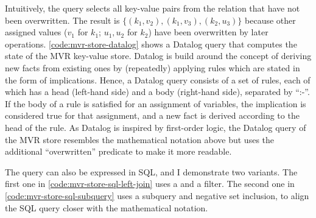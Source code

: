 Intuitively, the query selects all key-value pairs from the  relation
that have not been overwritten.
The result is \(\{ (k_1, v_2), (k_1, v_3), (k_2, u_3)\}\) because other assigned values
(\(v_1\) for \(k_1\); \(u_1, u_2\) for \(k_2\)) have been overwritten by later operations.
\ref{code:mvr-store-datalog} shows a Datalog query that computes the state of the
\ac{MVR} key-value store.
Datalog is build around the concept of deriving new facts from existing ones
by (repeatedly) applying rules which are stated in the form of implications.
Hence, a Datalog query consists of a set of rules, each of which has a
head (left-hand side) and a body (right-hand side), separated by ``:-''.
If the body of a rule is satisfied for an assignment of variables,
the implication is considered true for that assignment,
and a new fact is derived according to the head of the rule.
As Datalog is inspired by first-order logic, the Datalog query of the \ac{MVR}
store resembles the mathematical notation above but uses the
additional ``overwritten'' predicate to make it more readable.

The query can also be expressed in SQL, and I demonstrate two variants.
The first one in \ref{code:mvr-store-sql-left-join} uses a 
and a  filter.
The second one in \ref{code:mvr-store-sql-subquery} uses a subquery
and negative set inclusion, to align the SQL query closer with the mathematical
notation.

